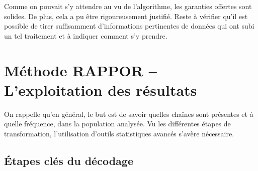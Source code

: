 \documentclass[a4paper,11pt]{article} %
\begin{document}
Comme on pouvait s'y attendre au vu de l'algorithme, les garanties offertes sont solides. 
De plus, cela a pu être rigoureusement justifié. 
Reste à vérifier qu'il est possible de tirer suffisamment d'informations pertinentes de données qui ont subi un tel traitement et à indiquer comment s'y prendre.
\section{Méthode RAPPOR -- L'exploitation des résultats}
On rappelle qu'en général, le but est de savoir quelles chaînes sont présentes et à quelle fréquence, dans la population analysée. Vu les différentes étapes de transformation, l'utilisation d'outils statistiques avancés s'avère nécessaire.
%
\subsection{Étapes clés du décodage}
%
\end{document}
